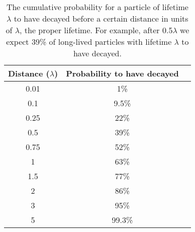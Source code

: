 
\begin{table}
\caption{The cumulative probability for a particle of lifetime $\lambda$ to have decayed before a certain distance in units of $\lambda$, the proper lifetime. For example, after 0.5$\lambda$ we expect 39\% of long-lived particles with lifetime $\lambda$ to have decayed.}
\begin{center}
\begin{tabular}{ccc}
Distance ($\lambda$) &  Probability to have decayed  \\
\hline
0.01               & 1\%                        \\
0.1                & 9.5\%                      \\              
0.25               & 22\%                       \\            
0.5                & 39\%                       \\          
0.75               & 52\%                       \\        
1                  & 63\%                       \\      
1.5                & 77\%                       \\    
2                  & 86\%                       \\  
3                  & 95\%                       \\
5                  & 99.3\%                     \\
\end{tabular}
\end{center}
\label{tab:lifetime}
\end{table}
